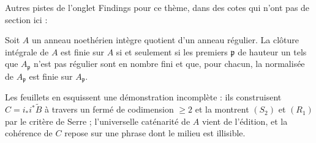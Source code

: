\bigskip
\noindent Autres pistes de l'onglet Findings pour ce thème, dans des cotes qui n'ont pas de section ici :\par

\begin{encadre}
\begin{theoreme*}\nonverifie
Soit $A$ un anneau noethérien intègre quotient d'un anneau régulier. La clôture intégrale de $A$ est finie sur $A$ si et seulement si les premiers $\mathfrak p$ de hauteur un tels que $A_{\mathfrak p}$ n'est pas régulier sont en nombre fini et que, pour chacun, la normalisée de $A_{\mathfrak p}$ est finie sur $A_{\mathfrak p}$.
\end{theoreme*}
\end{encadre}
{\small Les feuillets en esquissent une démonstration incomplète : ils construisent $C = i_*i^*\tilde B$ à travers un fermé de codimension $\geq 2$ et la montrent $(S_2)$ et $(R_1)$ par le critère de Serre ; l'universelle caténarité de $A$ vient de l'édition, et la cohérence de $C$ repose sur une phrase dont le milieu est illisible.\par}

